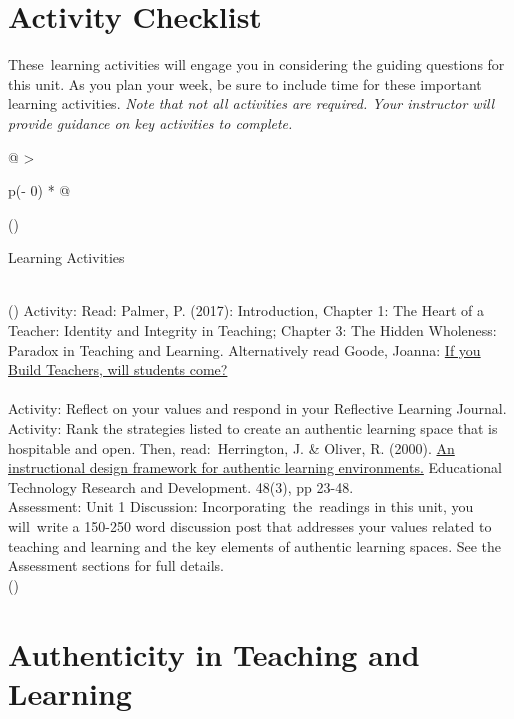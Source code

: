 \documentclass[
]{book}
\begin{document}
\hypertarget{activity-checklist}{%
\section*{Activity Checklist}\label{activity-checklist}}

These~learning activities will engage you in considering the guiding questions for this unit. As you plan your week, be sure to include time for these important learning activities. \emph{Note that not all activities are required. Your instructor will provide guidance on key activities to complete.}

\begin{longtable}[]{@{}
  >{\raggedright\arraybackslash}p{(\columnwidth - 0\tabcolsep) * }@{}}
\toprule()
\begin{minipage}[b]{\linewidth}\raggedright
Learning Activities
\end{minipage} \\
\midrule()
\endhead
Activity: Read: Palmer, P. (2017): Introduction, Chapter 1: The Heart of a Teacher: Identity and Integrity in Teaching; Chapter 3: The Hidden Wholeness: Paradox in Teaching and Learning. Alternatively read Goode, Joanna: \href{https://journals-sagepub-com.twu.idm.oclc.org/doi/pdf/10.2190/2102-5G77-QL77-5506}{If you Build Teachers, will students come?} \\
 \\
Activity: Reflect on your values and respond in your Reflective Learning Journal. \\
Activity: Rank the strategies listed to create an authentic learning space that is hospitable and open. Then, read:~Herrington, J. \& Oliver, R. (2000). \href{https://ro.uow.edu.au/edupapers/31/}{An instructional design framework for authentic learning environments.} Educational Technology Research and Development. 48(3), pp 23-48. \\
Assessment: Unit 1 Discussion: Incorporating~the~readings in this unit, you will~write a 150-250 word discussion post that addresses your values related to teaching and learning and the key elements of authentic learning spaces. See the Assessment sections for full details. \\
\bottomrule()
\end{longtable}

\hypertarget{authenticity-in-teaching-and-learning}{%
\section{Authenticity in Teaching and Learning}\label{authenticity-in-teaching-and-learning}}
\end{document}
